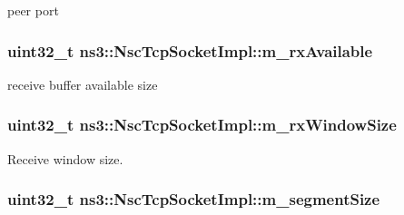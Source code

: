 peer port 

\subsubsection[{\texorpdfstring{m\+\_\+rx\+Available}{m_rxAvailable}}]{\setlength{\rightskip}{0pt plus 5cm}uint32\+\_\+t ns3\+::\+Nsc\+Tcp\+Socket\+Impl\+::m\+\_\+rx\+Available\hspace{0.3cm}{\ttfamily [private]}}\hypertarget{classns3_1_1NscTcpSocketImpl_a89af3e7d49f82fd1c31c5ee46e0cd480}{}\label{classns3_1_1NscTcpSocketImpl_a89af3e7d49f82fd1c31c5ee46e0cd480}


receive buffer available size 

\subsubsection[{\texorpdfstring{m\+\_\+rx\+Window\+Size}{m_rxWindowSize}}]{\setlength{\rightskip}{0pt plus 5cm}uint32\+\_\+t ns3\+::\+Nsc\+Tcp\+Socket\+Impl\+::m\+\_\+rx\+Window\+Size\hspace{0.3cm}{\ttfamily [private]}}\hypertarget{classns3_1_1NscTcpSocketImpl_ab32850c3c3ab62f1616c8531c7431b14}{}\label{classns3_1_1NscTcpSocketImpl_ab32850c3c3ab62f1616c8531c7431b14}


Receive window size. 

\subsubsection[{\texorpdfstring{m\+\_\+segment\+Size}{m_segmentSize}}]{\setlength{\rightskip}{0pt plus 5cm}uint32\+\_\+t ns3\+::\+Nsc\+Tcp\+Socket\+Impl\+::m\+\_\+segment\+Size\hspace{0.3cm}{\ttfamily [private]}}\hypertarget{classns3_1_1NscTcpSocketImpl_af89a595fba2c7247c55c82947de87ec3}{}\label{classns3_1_1NscTcpSocketImpl_af89a595fba2c7247c55c82947de87ec3}


